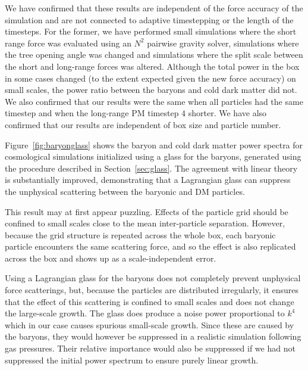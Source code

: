 \documentclass[a4paper,11pt]{article}
\begin{document}
We have confirmed that these results are independent of the force accuracy of the simulation and are not connected to adaptive timestepping or the length of the timesteps. For the former, we have performed small simulations where the short range force was evaluated using an $N^2$ pairwise gravity solver, simulations where the tree opening angle was changed and simulations where the split scale between the short and long-range forces was altered. Although the total power in the box in some cases changed (to the extent expected given the new force accuracy) on small scales, the power ratio between the baryons and cold dark matter did not.
We also confirmed that our results were the same when all particles had the same timestep and when the long-range PM timestep $4$ shorter. We have also confirmed that our results are independent of box size and particle number.

Figure~\ref{fig:baryonglass} shows the baryon and cold dark matter power spectra for cosmological simulations initialized using a glass for the baryons, generated using the procedure described in Section~\ref{sec:glass}. The agreement with linear theory is substantially improved, demonstrating that a Lagrangian glass can suppress the unphysical scattering between the baryonic and DM particles.

This result may at first appear puzzling. Effects of the particle grid should be confined to small scales close to the mean inter-particle separation. However, because the grid structure is repeated across the whole box, each baryonic particle encounters the same scattering force, and so the effect is also replicated across the box and shows up as a scale-independent error.

Using a Lagrangian glass for the baryons does not completely prevent unphysical force scatterings, but, because the particles are distributed irregularly, it ensures that the effect of this scattering is confined to small scales and does not change the large-scale growth. The glass does produce a noise power proportional to $k^4$ which in our case causes spurious small-scale growth. Since these are caused by the baryons, they would however be suppressed in a realistic simulation following gas pressures. Their relative importance would also be suppressed if we had not suppressed the initial power spectrum to ensure purely linear growth.
\end{document}
